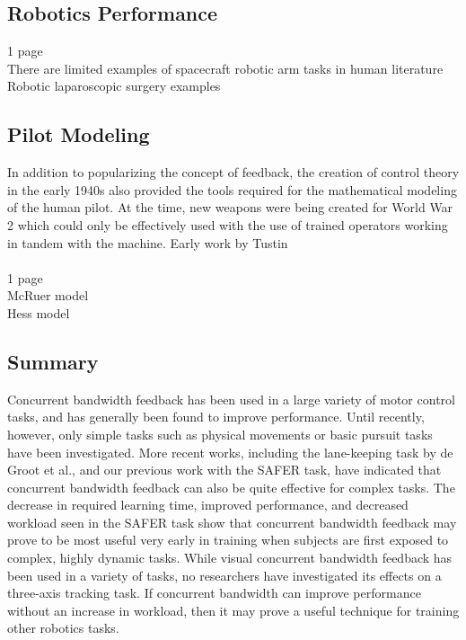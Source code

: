 \documentclass[float=false, crop=false]{standalone}
\begin{document}
\subsection{Robotics Performance}
1 page\\
There are limited examples of spacecraft robotic arm tasks in human literature\\
Robotic laparoscopic surgery examples

\subsection{Pilot Modeling}
In addition to popularizing the concept of feedback, the creation of control theory in the early 1940s also provided the tools required for the mathematical modeling of the human pilot. At the time, new weapons were being created for World War 2 which could only be effectively used with the use of trained operators working in tandem with the machine. Early work by Tustin~\cite{tustininvestigation}\\
\\
1 page\\
McRuer model\\
Hess model\\


\subsection{Summary}

Concurrent bandwidth feedback has been used in a large variety of motor control tasks, and has generally been found to improve performance.
Until recently, however, only simple tasks such as physical movements or basic pursuit tasks have been investigated.
More recent works, including the lane-keeping task by de Groot et al., and our previous work with the SAFER task, have indicated that concurrent bandwidth feedback can also be quite effective for complex tasks.
The decrease in required learning time, improved performance, and decreased workload seen in the SAFER task show that concurrent bandwidth feedback may prove to be most useful very early in training when subjects are first exposed to complex, highly dynamic tasks.
While visual concurrent bandwidth feedback has been used in a variety of tasks, no researchers have investigated its effects on a three-axis tracking task.
If concurrent bandwidth can improve performance without an increase in workload, then it may prove a useful technique for training other robotics tasks.
\end{document}
